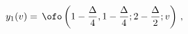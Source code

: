 \begin{equation}
y_1 (v) = \, \ofo \left( 1-{\Delta\over 4},  1-{\Delta\over 4};  
2-{\Delta\over 2}; v\right)\,,
\label{a_hyper_1}
\end{equation}

